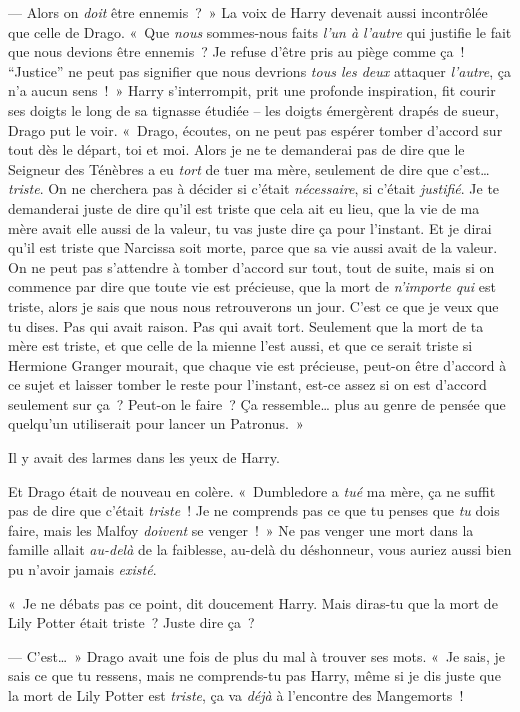 --- Alors on \emph{doit} être ennemis~?~»
La voix de Harry devenait aussi incontrôlée que celle de Drago.
«~Que \emph{nous} sommes-nous faits \emph{l'un à l'autre} qui justifie le fait que nous devions être ennemis~?
Je refuse d'être pris au piège comme ça~!
“Justice” ne peut pas signifier que nous devrions \emph{tous les deux} attaquer \emph{l'autre}, ça n'a aucun sens~!~»
Harry s'interrompit, prit une profonde inspiration, fit courir ses doigts le long de sa tignasse étudiée -- les doigts émergèrent drapés de sueur, Drago put le voir.
«~Drago, écoutes, on ne peut pas espérer tomber d'accord sur tout dès le départ, toi et moi.
Alors je ne te demanderai pas de dire que le Seigneur des Ténèbres a eu \emph{tort} de tuer ma mère, seulement de dire que c'est…
\emph{triste}.
On ne cherchera pas à décider si c'était \emph{nécessaire}, si c'était \emph{justifié}.
Je te demanderai juste de dire qu'il est triste que cela ait eu lieu, que la vie de ma mère avait elle aussi de la valeur, tu vas juste dire ça pour l'instant.
Et je dirai qu'il est triste que Narcissa soit morte, parce que sa vie aussi avait de la valeur.
On ne peut pas s'attendre à tomber d'accord sur tout, tout de suite, mais si on commence par dire que toute vie est précieuse, que la mort de \emph{n'importe qui} est triste, alors je sais que nous nous retrouverons un jour.
C'est ce que je veux que tu dises.
Pas qui avait raison.
Pas qui avait tort.
Seulement que la mort de ta mère est triste, et que celle de la mienne l'est aussi, et que ce serait triste si Hermione Granger mourait, que chaque vie est précieuse, peut-on être d'accord à ce sujet et laisser tomber le reste pour l'instant, est-ce assez si on est d'accord seulement sur ça~?
Peut-on le faire~?
Ça ressemble… plus au genre de pensée que quelqu'un utiliserait pour lancer un Patronus.~»

Il y avait des larmes dans les yeux de Harry.

Et Drago était de nouveau en colère.
«~Dumbledore a \emph{tué} ma mère, ça ne suffit pas de dire que c'était \emph{triste}~!
Je ne comprends pas ce que tu penses que \emph{tu} dois faire, mais les Malfoy \emph{doivent} se venger~!~»
Ne pas venger une mort dans la famille allait \emph{au-delà} de la faiblesse, au-delà du déshonneur, vous auriez aussi bien pu n'avoir jamais \emph{existé}.

«~Je ne débats pas ce point, dit doucement Harry.
Mais diras-tu que la mort de Lily Potter était triste~?
Juste dire ça~?

--- C'est…~»
Drago avait une fois de plus du mal à trouver ses mots.
«~Je sais, je sais ce que tu ressens, mais ne comprends-tu pas Harry, même si je dis juste que la mort de Lily Potter est \emph{triste}, ça va \emph{déjà} à l'encontre des Mangemorts~!

